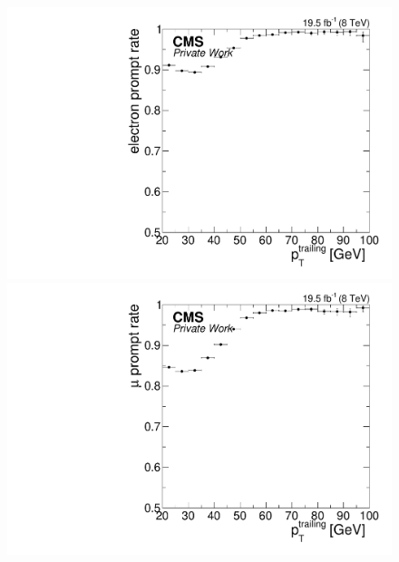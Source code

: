 \begin{figure}[htbp]
\centering
\begin{minipage}[t]{0.49\textwidth}
  \includegraphics[width=\textwidth]{plots/BG/nonPrompt/promptRate_ele_Inclusive_Full2012_TrailingPt_range100.pdf}
\end{minipage}
\begin{minipage}[t]{0.49\textwidth}
\includegraphics[width=\textwidth]{plots/BG/nonPrompt/promptRate_mu_Inclusive_Full2012_TrailingPt_range100.pdf}
\end{minipage}
\begin{minipage}[t]{0.49\textwidth}

\end{minipage}
\end{figure}
